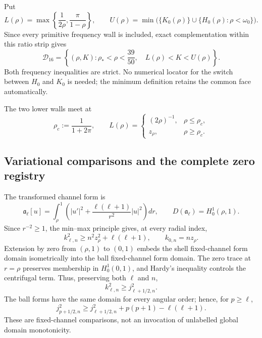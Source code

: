 \documentclass[11pt]{article}
\numberwithin{equation}{section}
\theoremstyle{definition}
\theoremstyle{remark}
\begin{document}
Put
\[
 L(\rho)=\max\left\{\frac1{2\rho},\frac\pi{1-\rho}\right\},
 \qquad
 U(\rho)=
 \min\bigl(\{K_0(\rho)\}\cup
 \{H_0(\rho):\rho<\omega_0\}\bigr).
\]
Since every primitive frequency wall is included, exact complementation
within this ratio strip gives
\begin{equation}
 \mathcal D_{16}=
 \left\{(\rho,K):\rho_*<\rho<\frac{39}{50},\quad
 L(\rho)<K<U(\rho)\right\}.
 \label{cm:eq-D16}
\end{equation}
Both frequency inequalities are strict.  No numerical locator for the
switch between \(H_0\) and \(K_0\) is needed; the minimum definition retains
the common face automatically.

The two lower walls meet at
\[
 \rho_c:=\frac1{1+2\pi},\qquad
 L(\rho)=
 \begin{cases}
  (2\rho)^{-1},&\rho\leq\rho_c,\\
  z_\rho,&\rho\geq\rho_c.
 \end{cases}
\]

\subsection{Variational comparisons and the complete zero registry}

The transformed channel form is
\[
 \mathfrak a_\ell[u]=\int_\rho^1
 \left(|u'|^2+\frac{\ell(\ell+1)}{r^2}|u|^2\right)dr,
 \qquad D(\mathfrak a_\ell)=H_0^1(\rho,1).
\]
Since \(r^{-2}\geq1\), the min--max principle gives, at every radial
index,
\begin{equation}
 k_{\ell,n}^2\geq n^2z_\rho^2+\ell(\ell+1),
 \qquad k_{0,n}=nz_\rho.
 \label{cm:eq-product-bound}
\end{equation}
Extension by zero from \((\rho,1)\) to \((0,1)\) embeds the shell
fixed-channel form domain isometrically into the ball fixed-channel form
domain.  The zero trace at \(r=\rho\) preserves membership in
\(H_0^1(0,1)\), and Hardy's inequality controls the centrifugal term.
Thus, preserving both \(\ell\) and \(n\),
\begin{equation}
 k_{\ell,n}^2\geq j_{\ell+1/2,n}^2.
 \label{cm:eq-shell-ball}
\end{equation}
The ball forms have the same domain for every angular order; hence, for
\(p\geq\ell\),
\begin{equation}
 j_{p+1/2,n}^2\geq j_{\ell+1/2,n}^2
 +p(p+1)-\ell(\ell+1).
 \label{cm:eq-angular-propagation}
\end{equation}
These are fixed-channel comparisons, not an invocation of unlabelled
global domain monotonicity.
\end{document}

